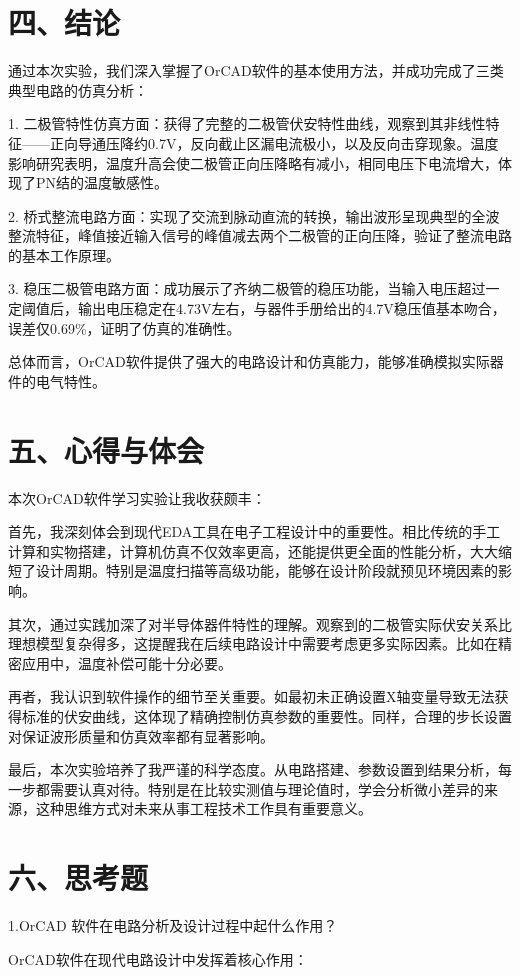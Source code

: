\documentclass[12pt,a4paper]{article}
\begin{document}
\section*{四、结论}
通过本次实验，我们深入掌握了OrCAD软件的基本使用方法，并成功完成了三类典型电路的仿真分析：

1. 二极管特性仿真方面：获得了完整的二极管伏安特性曲线，观察到其非线性特征——正向导通压降约0.7V，反向截止区漏电流极小，以及反向击穿现象。温度影响研究表明，温度升高会使二极管正向压降略有减小，相同电压下电流增大，体现了PN结的温度敏感性。

2. 桥式整流电路方面：实现了交流到脉动直流的转换，输出波形呈现典型的全波整流特征，峰值接近输入信号的峰值减去两个二极管的正向压降，验证了整流电路的基本工作原理。

3. 稳压二极管电路方面：成功展示了齐纳二极管的稳压功能，当输入电压超过一定阈值后，输出电压稳定在4.73V左右，与器件手册给出的4.7V稳压值基本吻合，误差仅0.69\%，证明了仿真的准确性。

总体而言，OrCAD软件提供了强大的电路设计和仿真能力，能够准确模拟实际器件的电气特性。

\section*{五、心得与体会}
本次OrCAD软件学习实验让我收获颇丰：

首先，我深刻体会到现代EDA工具在电子工程设计中的重要性。相比传统的手工计算和实物搭建，计算机仿真不仅效率更高，还能提供更全面的性能分析，大大缩短了设计周期。特别是温度扫描等高级功能，能够在设计阶段就预见环境因素的影响。

其次，通过实践加深了对半导体器件特性的理解。观察到的二极管实际伏安关系比理想模型复杂得多，这提醒我在后续电路设计中需要考虑更多实际因素。比如在精密应用中，温度补偿可能十分必要。

再者，我认识到软件操作的细节至关重要。如最初未正确设置X轴变量导致无法获得标准的伏安曲线，这体现了精确控制仿真参数的重要性。同样，合理的步长设置对保证波形质量和仿真效率都有显著影响。

最后，本次实验培养了我严谨的科学态度。从电路搭建、参数设置到结果分析，每一步都需要认真对待。特别是在比较实测值与理论值时，学会分析微小差异的来源，这种思维方式对未来从事工程技术工作具有重要意义。

\section*{六、思考题}
1.OrCAD 软件在电路分析及设计过程中起什么作用？

OrCAD软件在现代电路设计中发挥着核心作用：
\end{document}
